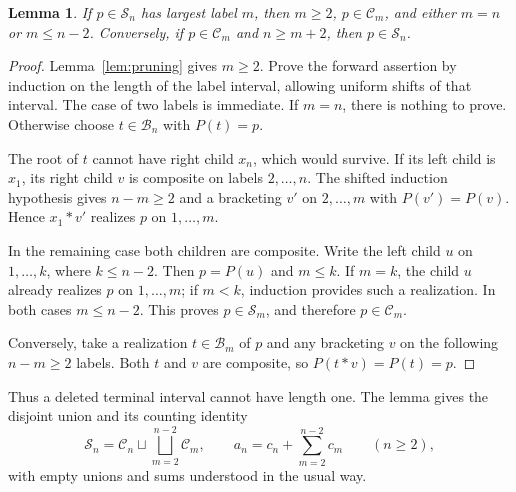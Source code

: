 \documentclass[11pt]{amsart}
\newtheorem{lemma}[theorem]{Lemma}
\newcommand{\B}{\mathcal{B}}
\newcommand{\Sset}{\mathcal{S}}
\newcommand{\Cset}{\mathcal{C}}
\begin{document}
\begin{lemma}\label{lem:terminal}
If \(p\in\Sset_n\) has largest label \(m\), then \(m\geq2\),
\(p\in\Cset_m\), and either \(m=n\) or \(m\leq n-2\).
Conversely, if \(p\in\Cset_m\) and \(n\geq m+2\), then
\(p\in\Sset_n\).
\end{lemma}
\begin{proof}
Lemma~\ref{lem:pruning} gives \(m\geq2\). Prove the forward
assertion by induction on the length of the label interval, allowing
uniform shifts of that interval. The case of two labels is immediate.
If \(m=n\), there is nothing to prove. Otherwise choose
\(t\in\B_n\) with \(P(t)=p\).

The root of \(t\) cannot have right child \(x_n\), which would
survive. If its left child is \(x_1\), its right child \(v\) is
composite on labels \(2,\ldots,n\). The shifted induction hypothesis
gives \(n-m\geq2\) and a bracketing \(v'\) on
\(2,\ldots,m\) with \(P(v')=P(v)\). Hence \(x_1*v'\) realizes
\(p\) on \(1,\ldots,m\).

In the remaining case both children are composite. Write the left
child \(u\) on \(1,\ldots,k\), where \(k\leq n-2\).
Then \(p=P(u)\) and \(m\leq k\). If \(m=k\), the child \(u\)
already realizes \(p\) on \(1,\ldots,m\); if \(m<k\), induction
provides such a realization. In both cases \(m\leq n-2\).
This proves \(p\in\Sset_m\), and therefore \(p\in\Cset_m\).

Conversely, take a realization \(t\in\B_m\) of \(p\) and any
bracketing \(v\) on the following \(n-m\geq2\) labels. Both
\(t\) and \(v\) are composite, so \(P(t*v)=P(t)=p\).
\end{proof}

Thus a deleted terminal interval cannot have length one. The lemma gives
the disjoint union and its counting identity
\begin{equation}\label{eq:decomposition}
 \Sset_n=\Cset_n\sqcup\bigsqcup_{m=2}^{n-2}\Cset_m,
 \qquad
 a_n=c_n+\sum_{m=2}^{n-2}c_m\qquad(n\geq2),
\end{equation}
with empty unions and sums understood in the usual way.
\end{document}
